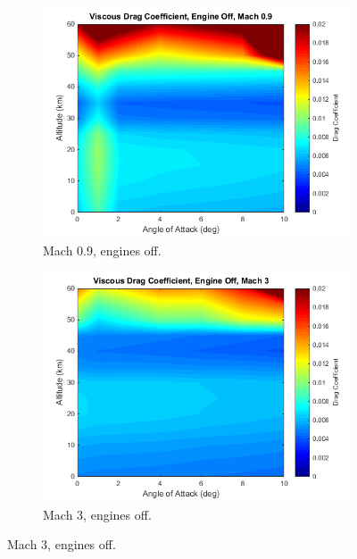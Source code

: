 		\begin{figure}[ht]
			\begin{subfigure}{.5\textwidth}
				\centering
				\includegraphics[width=0.99\linewidth]{figures/3_vehicle_design/ViscousCd1}
				\caption{Mach 0.9, engines off.}
			\end{subfigure}
			\begin{subfigure}{.5\textwidth}
				\centering
				\includegraphics[width=0.99\linewidth]{figures/3_vehicle_design/ViscousCd2}
				\caption{Mach 3, engines off.}
				

\end{subfigure}
\end{figure}

